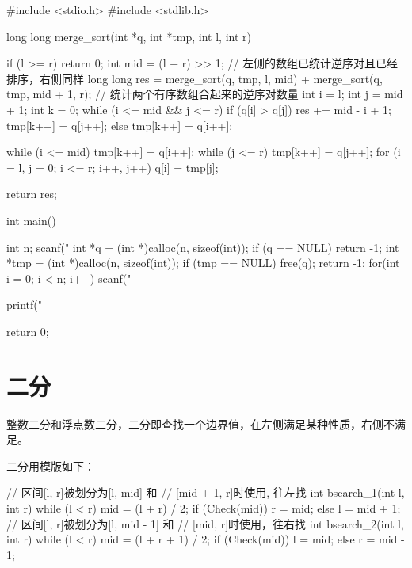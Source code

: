 \begin{mycpptwocol}[归并排序计算逆序对数量]
    #include <stdio.h>
    #include <stdlib.h>

    long long merge_sort(int *q, int *tmp,
    int l, int r) {
        if (l >= r) {
            return 0;
        }
        int mid = (l + r) >> 1;
        // 左侧的数组已统计逆序对且已经排序，右侧同样
        long long res = merge_sort(q, tmp, l, mid) + merge_sort(q, tmp, mid + 1, r);
        // 统计两个有序数组合起来的逆序对数量
        int i = l;
        int j = mid + 1;
        int k = 0;
        while (i <= mid && j <= r) {
            if (q[i] > q[j]) {
                res += mid - i + 1;
                tmp[k++] = q[j++];
            } else {
                tmp[k++] = q[i++];
            }
        }

        while (i <= mid) {
            tmp[k++] = q[i++];
        }
        while (j <= r) {
            tmp[k++] = q[j++];
        }
        for (i = l, j = 0; i <= r;
        i++, j++) {
            q[i] = tmp[j];
        }

        return res;
    }

    int main() {
        int n;
        scanf("%
        int *q = (int *)calloc(n, sizeof(int));
        if (q == NULL) {
            return -1;
        }
        int *tmp = (int *)calloc(n, sizeof(int));
        if (tmp == NULL) {
            free(q);
            return -1;
        }
        for(int i = 0; i < n; i++) {
            scanf("%
        }

        printf("%

        return 0;
    }
\end{mycpptwocol}


\section{二分}
整数二分和浮点数二分，二分即查找一个边界值，在左侧满足某种性质，右侧不满足。

二分用模版如下：
\begin{mycpptwocol}[二分模版]
    // 区间[l, r]被划分为[l, mid] 和
    // [mid + 1, r]时使用, 往左找
    int bsearch_1(int l, int r) {
        while (l < r) {
            mid = (l + r) / 2;
            if (Check(mid)) {
                r = mid;
            } else {
                l = mid + 1;
            }
        }
    }
    // 区间[l, r]被划分为[l, mid - 1] 和
    // [mid, r]时使用，往右找
    int bsearch_2(int l, int r) {
        while (l < r) {
            mid = (l + r + 1) / 2;
            if (Check(mid)) {
                l = mid;
            } else {
                r = mid - 1;
            }
        }
    }
\end{mycpptwocol}

